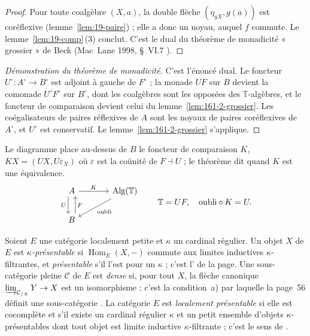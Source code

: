 \begin{proof}
Pour toute coalgèbre $(X, a)$, la double flèche $(\eta_{gX}, g(a))$ est coréflexive (lemme~\ref{lem:19-paire}) ; elle a donc un noyau, auquel $f$ commute. Le lemme~\ref{lem:19-comp}\,(3) conclut. C'est le dual du théorème de monadicité « grossier » de Beck (Mac~Lane 1998, §~VI.7 \cite{maclane1998}).
\end{proof}

\begin{proof}[Démonstration du théorème de monadicité]
C'est l'énoncé dual. Le foncteur $U^\circ : A^\circ \to B^\circ$ est adjoint à gauche de $F^\circ$ ; la monade $UF$ sur $B$ devient la comonade $U^\circ F^\circ$ sur $B^\circ$, dont les coalgèbres sont les opposées des $\mathbb T$-algèbres, et le foncteur de comparaison devient celui du lemme~\ref{lem:161-2-grossier}. Les coégalisateurs de paires réflexives de $A$ sont les noyaux de paires coréflexives de $A^\circ$, et $U^\circ$ est conservatif. Le lemme~\ref{lem:161-2-grossier} s'applique.
\end{proof}

Le diagramme place au-dessus de $B$ le foncteur de comparaison $K$, $KX = (UX, U\varepsilon_X)$ où $\varepsilon$ est la coünité de $F \dashv U$ ; le théorème dit quand $K$ est une équivalence.
\[
\begin{tikzcd}[column sep=large]
A \arrow[r, "K"] \arrow[d, shift right=1ex, "U"'] & \mathrm{Alg}(\mathbb T) \arrow[dl, "\text{oubli}"] \\
B \arrow[u, shift right=1ex, "F"'] &
\end{tikzcd}
\qquad \mathbb T = UF, \quad \text{oubli} \circ K = U.
\]

\begin{definition}
Soient $E$ une catégorie localement petite et $\kappa$ un cardinal régulier. Un objet $X$ de $E$ est \emph{$\kappa$-présentable} si $\operatorname{Hom}_E(X, -)$ commute aux limites inductives $\kappa$-filtrantes, et \emph{présentable} s'il l'est pour un $\kappa$ ; c'est l' de la page. Une sous-catégorie pleine $\mathcal C$ de $E$ est \emph{dense} si, pour tout $X$, la flèche canonique $\varinjlim_{\mathcal C_{/X}} Y \to X$ est un isomorphisme ; c'est la condition~a) par laquelle la page~56 définit une sous-catégorie . La catégorie $E$ est \emph{localement présentable} si elle est cocomplète et s'il existe un cardinal régulier $\kappa$ et un petit ensemble d'objets $\kappa$-présentables dont tout objet est limite inductive $\kappa$-filtrante ; c'est le sens de .
\end{definition}

